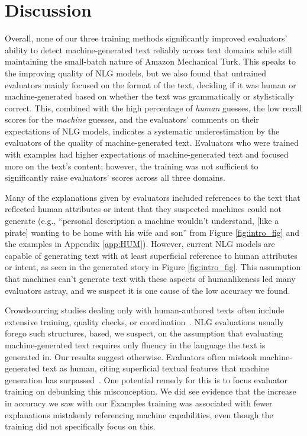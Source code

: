 \section{Discussion}\label{sec:discussion}
Overall, none of our three training methods significantly improved evaluators' ability to detect machine-generated text reliably across text domains while still maintaining the small-batch nature of Amazon Mechanical Turk.
This speaks to the improving quality of NLG models, but we also found that untrained evaluators mainly focused on the format of the text, deciding if it was human or machine-generated based on whether the text was grammatically or stylistically correct. This, combined with the high percentage of \textit{human} guesses, the low recall scores for the \textit{machine} guesses,
and the evaluators' comments on their expectations of NLG models, indicates a systematic underestimation by the evaluators of the quality of machine-generated text. 
Evaluators who were trained with examples had higher expectations of machine-generated text and focused more on the text's content; however, the training was not sufficient to significantly raise evaluators' scores across all three domains.

Many of the explanations given by evaluators included references to the text that reflected human attributes or intent that they suspected machines could not generate (e.g., ``personal description a machine wouldn't understand, [like a pirate] wanting to be home with his wife and son'' from Figure \ref{fig:intro_fig} and the examples in Appendix \ref{app:HUM}).
However, current NLG models are capable of generating text with at least superficial reference to human attributes or intent, as seen in the generated story in Figure \ref{fig:intro_fig}. This assumption that machines can't generate text with these aspects of humanlikeness led many evaluators astray, and we suspect it is one cause of the low accuracy we found. 

Crowdsourcing studies dealing only with human-authored texts often include extensive training, quality checks, or coordination~\cite{10.1145/1460563.1460572, kim2017mechanical, bernstein2010soylent}.
NLG evaluations usually forego such structures, based, we suspect, on the assumption that evaluating machine-generated text requires only fluency in the language the text is generated in. 
Our results suggest otherwise. Evaluators often mistook machine-generated text as human, citing superficial textual features that machine generation has surpassed~\cite{gpt3}. 
One potential remedy for this is to focus evaluator training on debunking this misconception. We did see evidence that the increase in accuracy we saw with our Examples training was associated with fewer explanations mistakenly referencing machine capabilities, even though the training did not specifically focus on this.